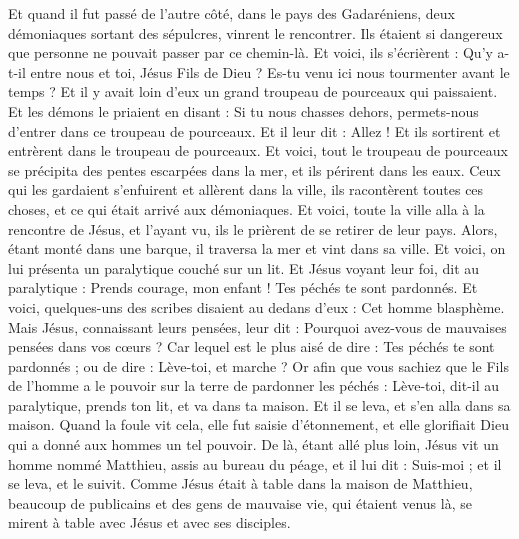 \begin{multicols}{2}
Et quand il fut passé de l'autre côté, dans le pays des Gadaréniens, deux démoniaques sortant des sépulcres, vinrent le rencontrer. Ils étaient si dangereux que personne ne pouvait passer par ce chemin-là.
Et voici, ils s'écrièrent : Qu'y a-t-il entre nous et toi, Jésus Fils de Dieu ? Es-tu venu ici nous tourmenter avant le temps ?
Et il y avait loin d'eux un grand troupeau de pourceaux qui paissaient.
Et les démons le priaient en disant : Si tu nous chasses dehors, permets-nous d’entrer dans ce troupeau de pourceaux.
Et il leur dit : Allez ! Et ils sortirent et entrèrent dans le troupeau de pourceaux. Et voici, tout le troupeau de pourceaux se précipita des pentes escarpées dans la mer, et ils périrent dans les eaux.
Ceux qui les gardaient s'enfuirent et allèrent dans la ville, ils racontèrent toutes ces choses, et ce qui était arrivé aux démoniaques.
Et voici, toute la ville alla à la rencontre de Jésus, et l'ayant vu, ils le prièrent de se retirer de leur pays.
\VerseOne{}Alors, étant monté dans une barque, il traversa la mer et vint dans sa ville.
Et voici, on lui présenta un paralytique couché sur un lit. Et Jésus voyant leur foi, dit au paralytique : Prends courage, mon enfant ! Tes péchés te sont pardonnés.
Et voici, quelques-uns des scribes disaient au dedans d’eux : Cet homme blasphème.
Mais Jésus, connaissant leurs pensées, leur dit : Pourquoi avez-vous de mauvaises pensées dans vos cœurs ?
Car lequel est le plus aisé de dire : Tes péchés te sont pardonnés ; ou de dire : Lève-toi, et marche ?
Or afin que vous sachiez que le Fils de l'homme a le pouvoir sur la terre de pardonner les péchés : Lève-toi, dit-il au paralytique, prends ton lit, et va dans ta maison.
Et il se leva, et s'en alla dans sa maison.
Quand la foule vit cela, elle fut saisie d’étonnement, et elle glorifiait Dieu qui a donné aux hommes un tel pouvoir.
De là, étant allé plus loin, Jésus vit un homme nommé Matthieu, assis au bureau du péage, et il lui dit : Suis-moi ; et il se leva, et le suivit.
Comme Jésus était à table dans la maison de Matthieu, beaucoup de publicains et des gens de mauvaise vie, qui étaient venus là, se mirent à table avec Jésus et avec ses disciples.

\end{multicols}

